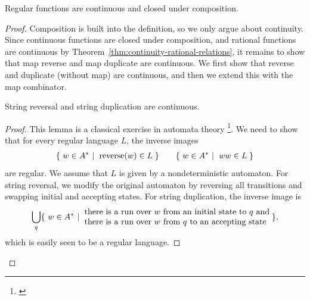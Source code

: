 \begin{theorem}\label{thm:regular-functions-are-continuous-and-closed-under-composition}
    Regular functions are continuous and closed under composition.
\end{theorem}
\begin{proof}
    Composition is built into the definition, so we only argue about continuity. Since continuous functions are closed under composition, and rational functions are continuous by Theorem~\ref{thm:continuity-rational-relations}, it remains to show that map reverse and map duplicate are continuous. We first show that reverse and duplicate (without map) are continuous, and then we extend this with the map combinator. 
\begin{lemma}\label{lem:reversal-duplication-continuous}
    String reversal and string duplication are continuous.
\end{lemma}
\begin{proof} This lemma is a classical exercise in automata theory
    \footnote{\cite[Problems 30 and 35]{200problems}}. 
    We need to show that for every regular language $L$, the inverse images 
    \begin{align*}
    \setbuild{ w \in A^*}{reverse$(w) \in L$}
    \qquad 
    \setbuild{ w \in A^*}{$ww \in L$}
    \end{align*}
    are regular. We assume that $L$ is given by a nondeterministic automaton. For string reversal, we modify the original automaton  by reversing all transitions and swapping initial and accepting states. For string duplication, the inverse image is 
    \begin{align*}
    \bigcup_{q} \setbuild{ w \in A^*}{
        there is a run over $w$ from an initial state to $q$ and \\
        there is a run over $w$ from $q$ to an accepting state
    },
    \end{align*}
    which is easily seen to be a regular language.
\end{proof}



\end{proof}
